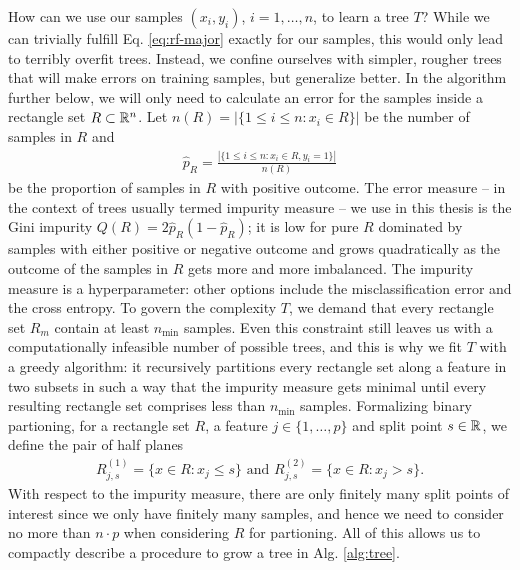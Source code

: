 How can we use our samples $(x_i, y_i)$, $i = 1, \ldots, n$, to learn a tree $T$? While we can 
trivially fulfill Eq. \eqref{eq:rf-major} exactly for our samples, this would only lead to terribly 
overfit trees. Instead, we confine ourselves with simpler, rougher trees that will make errors on 
training samples, but generalize better. 
In the algorithm further below, we will only need to calculate an error for the samples inside a 
rectangle set $R \subset \mathbb{R}^n$. Let $n(R) = |\{ 1 \leq i \leq n: x_i \in R \}|$ be the number of 
samples in $R$ and
\begin{align}
    \hat{p}_R = \frac{|\{ 1 \leq i \leq n: x_i \in R, y_i = 1 \}|}{n(R)}
\end{align}
be the proportion of samples in $R$ with positive outcome. The error measure -- in the context of 
trees usually termed impurity measure -- we use in this thesis
is the Gini impurity $Q(R) = 2 \hat{p}_R (1 - \hat{p}_R)$; it is low for pure $R$ dominated by 
samples with either positive or negative outcome and grows quadratically as the outcome of the 
samples in $R$ gets more and more imbalanced. The impurity measure is a hyperparameter: other 
options include the misclassification error and the cross entropy. To govern the complexity $T$,
we demand that every rectangle set $R_m$ contain at least $n_\text{min}$ samples. Even this 
constraint still leaves us with a computationally infeasible number of possible trees, and this is 
why we fit $T$ with a greedy algorithm: it recursively partitions every rectangle set along a 
feature in two subsets in such a way that the impurity measure gets minimal until every resulting 
rectangle set comprises less than $n_\text{min}$ samples. Formalizing binary partioning, for a 
rectangle set $R$, a feature $j \in \{1, \ldots, p\}$ and split point $s \in \mathbb{R}$, we define 
the pair of half planes
\begin{align}
    R^{(1)}_{j, s} = \{x \in R: x_j \leq s\} \text{ and } R^{(2)}_{j, s} = \{x \in R: x_j > s\}.
\end{align}
With respect to the impurity measure, there are only finitely many split points of interest since 
we only have finitely many samples, and hence we need to consider no more than $n \cdot p$ when 
considering $R$ for partioning. All of this allows us to compactly describe a procedure to grow a 
tree in Alg. \ref{alg:tree}.


